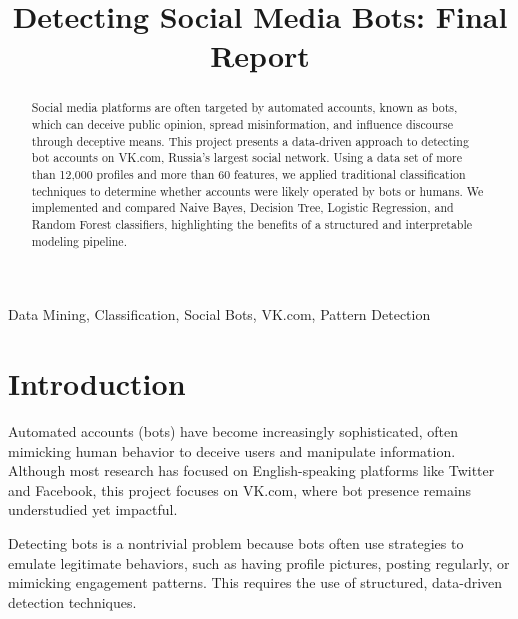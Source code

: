 \documentclass[conference]{IEEEtran}
\begin{document}
\title{Detecting Social Media Bots: Final Report}

\author{
}

\maketitle

\begin{abstract}
Social media platforms are often targeted by automated accounts, known as bots, which can deceive public opinion, spread misinformation, and influence discourse through deceptive means. This project presents a data-driven approach to detecting bot accounts on VK.com, Russia's largest social network. Using a data set of more than 12,000 profiles and more than 60 features, we applied traditional classification techniques to determine whether accounts were likely operated by bots or humans. We implemented and compared Naive Bayes, Decision Tree, Logistic Regression, and Random Forest classifiers, highlighting the benefits of a structured and interpretable modeling pipeline.
\end{abstract}

\begin{IEEEkeywords}
Data Mining, Classification, Social Bots, VK.com, Pattern Detection
\end{IEEEkeywords}

\section{Introduction}
Automated accounts (bots) have become increasingly sophisticated, often mimicking human behavior to deceive users and manipulate information. Although most research has focused on English-speaking platforms like Twitter and Facebook, this project focuses on VK.com, where bot presence remains understudied yet impactful.

Detecting bots is a nontrivial problem because bots often use strategies to emulate legitimate behaviors, such as having profile pictures, posting regularly, or mimicking engagement patterns. This requires the use of structured, data-driven detection techniques.
\end{document}
